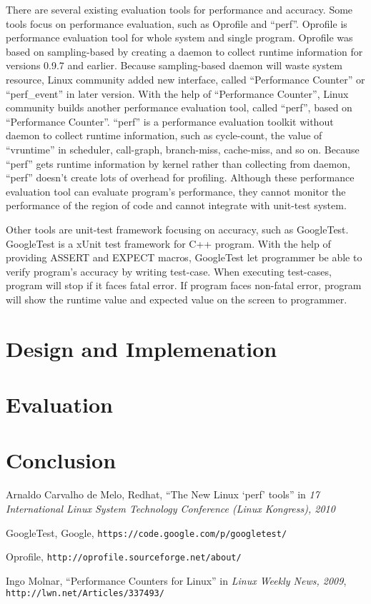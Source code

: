 \documentclass[final]{ols}
\begin{document}
There are several existing evaluation tools for performance and accuracy.
Some tools focus on performance evaluation, such as Oprofile\cite{oprofile} and ``perf''. 
Oprofile is performance evaluation tool for whole system and single program.
Oprofile was based on sampling-based by creating a daemon to collect runtime information for versions 0.9.7 and earlier.
Because sampling-based daemon will waste system resource, Linux community added new interface, called ``Performance Counter''\cite{performance-counter-linux} or ``perf\_event'' in later version.
With the help of ``Performance Counter'', Linux community builds another performance evaluation tool, called ``perf'', based on ``Performance Counter''. 
``perf'' is a performance evaluation toolkit without daemon to collect runtime information, such as cycle-count, the value of ``vruntime'' in scheduler, call-graph, branch-miss, cache-miss, and so on.
Because ``perf'' gets runtime information by kernel rather than collecting from daemon, ``perf'' doesn't create lots of overhead for profiling.
Although these performance evaluation tool can evaluate program's performance, they cannot monitor the performance of the region of code and cannot integrate with unit-test system.

Other tools are unit-test framework focusing on accuracy, such as GoogleTest.
GoogleTest is a xUnit test framework for C++ program.
With the help of providing ASSERT and EXPECT macros, GoogleTest let programmer be able to verify program's accuracy by writing test-case.
When executing test-cases, program will stop if it faces fatal error. 
If program faces non-fatal error, program will show the runtime value and expected value on the screen to programmer.

\section{Design and Implemenation}

\section{Evaluation}

\section{Conclusion}

\begin{thebibliography}{99}  %
Arnaldo Carvalho de Melo, Redhat, ``The New Linux `perf' tools'' in \emph{17 International Linux System Technology Conference (Linux Kongress), 2010}

GoogleTest, Google, \texttt{\small https://code.google.com/p/googletest/}

Oprofile, \texttt{\small http://oprofile.sourceforge.net/about/}

Ingo Molnar, ``Performance Counters for Linux'' in \emph{Linux Weekly News, 2009}, \texttt{\small http://lwn.net/Articles/337493/}

\end{thebibliography}
\end{document}
